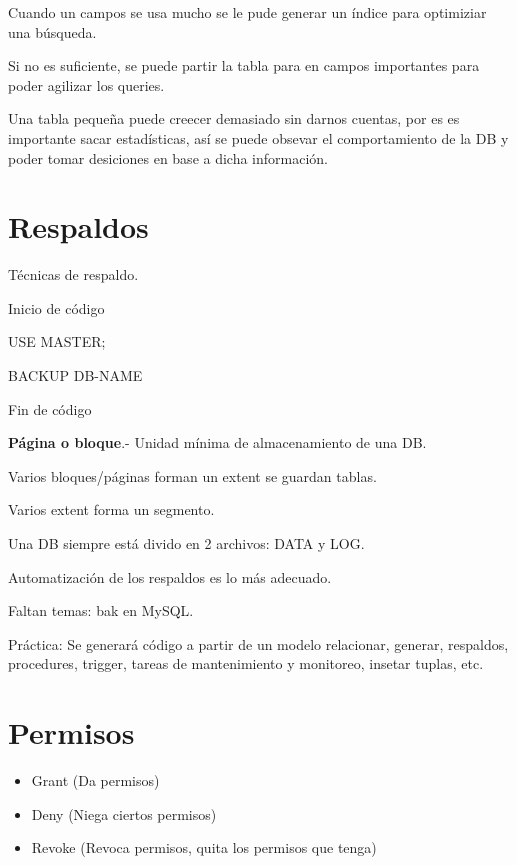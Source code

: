 \documentclass{article}
\begin{document}
Cuando un campos se usa mucho se le pude generar un índice para optimiziar
una búsqueda.
\vspace{1em}

Si no es suficiente, se puede partir la tabla para en campos importantes
para poder agilizar los queries.
\vspace{1em}

Una tabla pequeña puede creecer demasiado sin darnos cuentas, por es
es importante sacar estadísticas, así se puede obsevar el comportamiento
de la DB y poder tomar desiciones en base a dicha información.
\vspace{1em}

\section{Respaldos}

Técnicas de respaldo.
\vspace{1em}

Inicio de código

USE MASTER;

BACKUP DB-NAME

Fin de código
\vspace{1em}

\textbf{Página o bloque}.- Unidad mínima de almacenamiento de una DB.

Varios bloques/páginas forman un extent se guardan tablas.

Varios extent forma un segmento.
\vspace{1em}

Una DB siempre está divido en 2 archivos: DATA y LOG.
\vspace{1em}

Automatización de los respaldos es lo más adecuado.
\vspace{1em}

Faltan temas: bak en MySQL.

Práctica: Se generará código a partir de un modelo relacionar, generar, respaldos,
procedures, trigger, tareas de mantenimiento y monitoreo, insetar tuplas, etc.

\section{Permisos}

\begin{itemize}
	\item
	Grant (Da permisos)
	\item
	Deny (Niega ciertos permisos)
	\item
	Revoke (Revoca permisos, quita los permisos que tenga)
\end{itemize}
\vspace{1em}
\end{document}
